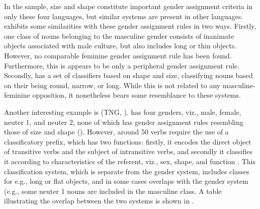 \documentclass[output=collectionpaper]{langsci/langscibook}
\begin{document}
In the sample, size and shape constitute important gender assignment criteria in only these four languages, but similar systems are present in other languages.  exhibits some similarities with these gender assignment rules in two ways. Firstly, one class of nouns belonging to the masculine gender consists of inanimate objects associated with male culture, but also includes long or thin objects. However, no comparable feminine gender assignment rule has been found. Furthermore, this is appears to be only a peripheral gender assignment rule. Secondly,  has a set of classifiers based on shape and size, classifying nouns based on their being round, narrow, or long. While this is not related to any masculine-feminine opposition, it nonetheless bears some resemblance to these systems.


Another interesting example is  (TNG, ).  has four genders, viz., male, female, neuter 1, and neuter 2, none of which has gender assignment rules resembling those of size and shape (\citealt[171--176]{Fedden2011}). However, around 50 verbs require the use of a classificatory prefix, which has two functions: firstly, it encodes the direct object of transitive verbs and the subject of intransitive verbs, and secondly it classifies it according to characteristics of the referent, viz., sex, shape, and function \citep[185]{Fedden2011}. This classification system, which is separate from the gender system, includes classes for e.g., long or flat objects, and in some cases overlaps with the gender system (e.g., some neuter 1 nouns are included in the masculine class. A table illustrating the overlap between the two systems is shown in .

%
%
\end{document}
